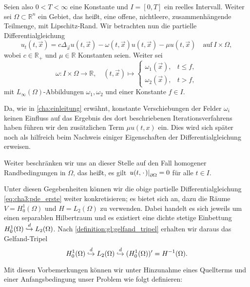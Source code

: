 Seien also $0 < T < \infty$ eine Konstante und $I = [0, T]$ ein reelles Intervall.
Weiter sei $\Omega \subset \mathbb{R}^{n}$ ein Gebiet, das heißt, eine offene, nichtleere, zusammenhängende Teilmenge, mit Lipschitz-Rand.
Wir betrachten nun die partielle Differentialgleichung
\begin{equation}
\label{eq:cha3:pde_erste}
    u_{t}(t, \vec{x}) = c \Delta_{\vec{x}} u(t, \vec{x}) - \omega(t, \vec{x}) u(t, \vec{x}) - \mu u(t, \vec{x}) \quad \text{auf}~I \times \Omega,
\end{equation}
wobei $c \in \mathbb{R}_{+}$ und $\mu \in \mathbb{R}$ Konstanten seien.
Weiter sei
\begin{equation}
\label{eq:pp:def_omega}
    \omega \colon I \times \Omega \to \mathbb{R}, \quad (t, \vec{x}) \mapsto
    \begin{cases}
        \omega_{1}(\vec{x}), & t \leq f, \\
        \omega_{2}(\vec{x}), & t > f,
    \end{cases}
\end{equation}
mit $L_{\infty}(\Omega)$-Abbildungen $\omega_{1}, \omega_{2}$ und einer Konstante $f \in I$.

Da, wie in \cref{cha:einleitung} erwähnt, konstante Verschiebungen der Felder $\omega_{i}$ keinen Einfluss auf das Ergebnis des dort beschriebenen Iterationsverfahrens haben führen wir den zusätzlichen Term $\mu u(t, x)$ ein.
Dies wird sich später noch als hilfreich beim Nachweis einiger Eigenschaften der Differentialgleichung erweisen.

Weiter beschränken wir uns an dieser Stelle auf den Fall homogener Randbedingungen in $\Omega$, das heißt, es gilt $\left.u(t, {\mkern2mu\cdot\mkern2mu})\right|_{\partial \Omega} = 0$ für alle $t \in I$.

Unter diesen Gegebenheiten können wir die obige partielle Differentialgleichung \cref{eq:cha3:pde_erste} weiter konkretisieren; es bietet sich an, dazu die Räume $V = H^{1}_{0}(\Omega)$ und $H = L_{2}(\Omega)$ zu verwenden.
Dabei handelt es sich jeweils um einen separablen Hilbertraum und es existiert eine dichte stetige Einbettung $H^{1}_{0}(\Omega) \stackrel{d}{\hookrightarrow} L_{2}(\Omega)$.
Nach \cref{definition:gl:gelfand_tripel} erhalten wir daraus das Gelfand-Tripel
\begin{equation}
\label{eq:cha3:gelfand_triple}
    H^{1}_{0}(\Omega) \stackrel{d}{\hookrightarrow} L_{2}(\Omega) \stackrel{d}{\hookrightarrow} (H^{1}_{0}(\Omega))' = H^{-1}(\Omega).
\end{equation}

Mit diesen Vorbemerkungen können wir unter Hinzunahme eines Quellterms und einer Anfangsbedingung unser Problem wie folgt definieren:

